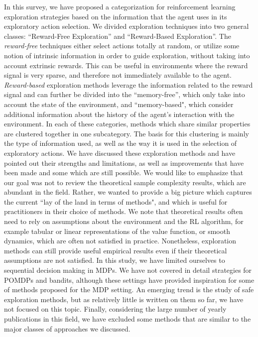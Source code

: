 \label{conclusion}
In this survey, we have proposed a categorization for reinforcement learning exploration strategies based on the information that the agent uses in its exploratory action selection. We divided exploration techniques into two general classes: ``Reward-Free Exploration'' and ``Reward-Based Exploration''. The \emph{reward-free} techniques either select actions totally at random, or utilize some notion of intrinsic information in order to  guide exploration, without taking into account extrinsic rewards. This can be useful in environments where the reward signal is very sparse, and therefore not immediately available to the agent.  \emph{Reward-based} exploration methods leverage the information related to the reward signal and can further be divided into the ``memory-free'', which only take into account the state of the environment, and ``memory-based", which consider additional information about the history of the agent's interaction with the environment. In each of these categories, methods which share similar properties are clustered together in one subcategory. The basis for this clustering is mainly the type of information used, as well as the way it is used in the selection of exploratory actions. We have discussed these exploration methods and have pointed out their strengths and limitations, as well as improvements that have been made and some which are still possible. We would like to emphasize that our goal was not to review the theoretical sample complexity results, which are abundant in the field. Rather, we wanted to provide a big picture which captures the current ``lay of the land in terms of methods", and which is useful for practitioners in their choice of methods. We note that theoretical results often need to rely on assumptions about the environment and the RL algorithm, for example tabular or linear representations of the value function, or smooth dynamics, which are often not satisfied in practice. Nonetheless, exploration methods can still provide useful empirical results even if their theoretical assumptions are not satisfied. 
 In this study, we have limited ourselves to sequential decision making in  MDPs. We have not covered in detail strategies for POMDPs and bandits, although these settings have provided inspiration  for some of methods proposed for the MDP setting. An emerging trend is the study of safe exploration methods, but as relatively little is written on them so far, we have not focused on this topic. Finally, considering the large number of yearly publications in this field, we have excluded some methods that are similar to the major classes of approaches we discussed.
